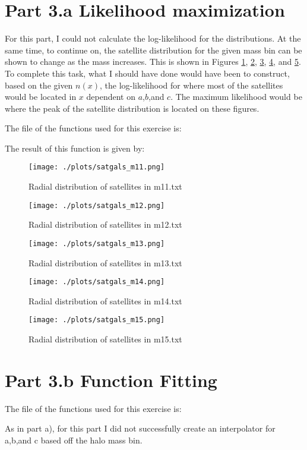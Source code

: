 \section{Part 3.a Likelihood maximization}

For this part, I could not calculate the log-likelihood for the distributions. At the same time, to continue on,
the satellite distribution for the given mass bin can be shown to change as the mass increases. This is shown in Figures
\ref{fig:m11}, \ref{fig:m12}, \ref{fig:m13}, \ref{fig:m14}, and \ref{fig:m15}. To complete this task, what I should have
done would have been to construct, based on the given $n(x)$, the log-likelihood for where most of the satellites would
be located in $x$ dependent on $a$,$b$,and $c$. The maximum likelihood would be where the peak of the satellite distribution
is located on these figures.

The file of the functions used for this exercise is:



The result of this function is given by:

%

\begin{figure}[h!]
  \centering
  \texttt{[image: ./plots/satgals\_m11.png]}
  \caption{Radial distribution of satellites in m11.txt}
  \label{fig:m11}
\end{figure}

\begin{figure}[h!]
  \centering
  \texttt{[image: ./plots/satgals\_m12.png]}
  \caption{Radial distribution of satellites in m12.txt}
  \label{fig:m12}
\end{figure}

\begin{figure}[h!]
  \centering
  \texttt{[image: ./plots/satgals\_m13.png]}
  \caption{Radial distribution of satellites in m13.txt}
  \label{fig:m13}
\end{figure}

\begin{figure}[h!]
  \centering
  \texttt{[image: ./plots/satgals\_m14.png]}
  \caption{Radial distribution of satellites in m14.txt}
  \label{fig:m14}
\end{figure}

\begin{figure}[h!]
  \centering
  \texttt{[image: ./plots/satgals\_m15.png]}
  \caption{Radial distribution of satellites in m15.txt}
  \label{fig:m15}
\end{figure}

\section{Part 3.b Function Fitting}

The file of the functions used for this exercise is:



As in part a), for this part I did not successfully create an interpolator for a,b,and c based off the halo mass bin.